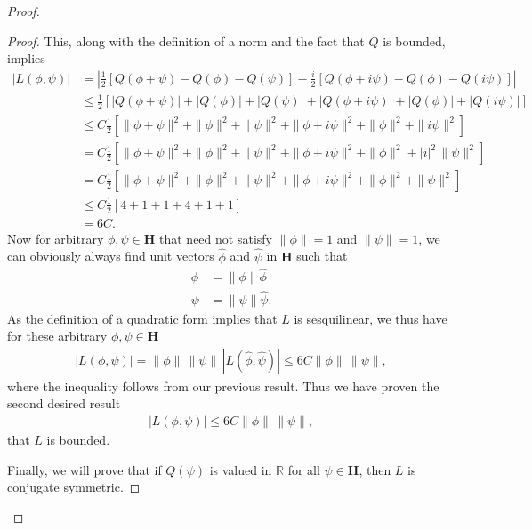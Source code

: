 \begin{proof}
\begin{proof}
This, along with the definition of a norm and the fact that $Q$ is bounded, implies
\begin{align}
    \left\lvert L(\phi, \psi) \right\rvert &= \left\lvert \frac{1}{2} \left[ Q(\phi + \psi) - Q(\phi) - Q(\psi) \right] -\frac{i}{2} \left[ Q(\phi + i\psi) - Q(\phi) - Q(i\psi) \right] \right\rvert \\
    &\le \frac{1}{2} \left[ \left\lvert Q(\phi + \psi)\right\rvert + \left\lvert Q(\phi)\right\rvert + \left\lvert Q(\psi)\right\rvert + \left\lvert Q(\phi + i\psi)\right\rvert + \left\lvert Q(\phi)\right\rvert + \left\lvert Q(i\psi)\right\rvert \right] \\
    &\le C \frac{1}{2} \left[ \|\phi + \psi\|^2 + \|\phi\|^2 + \|\psi\|^2 + \|\phi + i\psi\|^2 + \|\phi\|^2 + \|i\psi\|^2 \right] \\
    &=   C \frac{1}{2} \left[ \|\phi + \psi\|^2 + \|\phi\|^2 + \|\psi\|^2 + \|\phi + i\psi\|^2 + \|\phi\|^2 + \lvert i \rvert^2 \, \|\psi\|^2 \right] \\
    &=   C \frac{1}{2} \left[ \|\phi + \psi\|^2 + \|\phi\|^2 + \|\psi\|^2 + \|\phi + i\psi\|^2 + \|\phi\|^2 + \|\psi\|^2 \right] \\
    &\le C \frac{1}{2} \left[ 4 + 1 + 1 + 4 + 1 + 1 \right] \\
    &=   6C.
\end{align}
Now for arbitrary $\phi, \psi \in \mathbf{H}$ that need not satisfy $\|\phi\| = 1$ and $\|\psi\| = 1$, we can obviously always find unit vectors $\widehat{\phi}$ and $\widehat{\psi}$ in $\mathbf{H}$ such that
\begin{align}
    \phi &= \|\phi\| \widehat{\phi} \\
    \psi &= \|\psi\| \widehat{\psi}.
\end{align}
As the definition of a quadratic form implies that $L$ is sesquilinear, we thus have for these arbitrary $\phi, \psi \in \mathbf{H}$
\begin{align}
    \left\lvert L(\phi, \psi)\right\rvert = \|\phi\| \, \|\psi\| \, \left\lvert L(\widehat{\phi}, \widehat{\psi}) \right\rvert \le 6C \|\phi\| \, \|\psi\|,
\end{align}
where the inequality follows from our previous result. Thus we have proven the second desired result
\begin{align}
    \left\lvert L(\phi, \psi)\right\rvert \le 6C \|\phi\| \, \|\psi\|,
\end{align}
that $L$ is bounded.

Finally, we will prove that if $Q(\psi)$ is valued in $\mathbb{R}$ for all $\psi \in \mathbf{H}$, then $L$ is conjugate symmetric.


\end{proof}
\end{proof}
